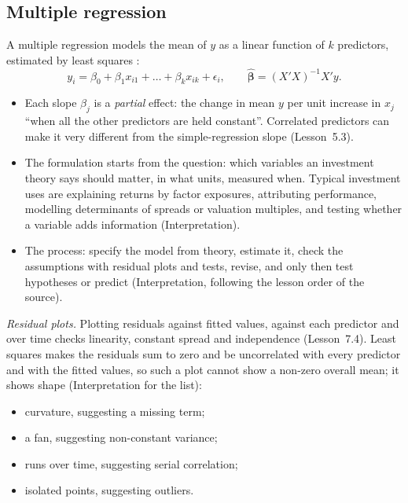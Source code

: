 \subsection{Multiple regression}

\begin{qfmethod}\label{meth:multiple-regression-formulation}
 A multiple regression models the mean of $y$ as a linear function of $k$ predictors, estimated by least squares \citep[Lessons~5.3--5.4]{regression-methods-course-notes}:
\[ y_i=\beta_0+\beta_1x_{i1}+\dots+\beta_kx_{ik}+\epsilon_i,\qquad \hat{\boldsymbol\beta}=(X'X)^{-1}X'y. \]
\begin{itemize}
\item Each slope $\beta_j$ is a \emph{partial} effect: the change in mean $y$ per unit increase in $x_j$ ``when all the other predictors are held constant''. Correlated predictors can make it very different from the simple-regression slope (Lesson~5.3).
\item The formulation starts from the question: which variables an investment theory says should matter, in what units, measured when. Typical investment uses are explaining returns by factor exposures, attributing performance, modelling determinants of spreads or valuation multiples, and testing whether a variable adds information (Interpretation).
\item The process: specify the model from theory, estimate it, check the assumptions with residual plots and tests, revise, and only then test hypotheses or predict (Interpretation, following the lesson order of the source).
\end{itemize}

\emph{Residual plots.} Plotting residuals against fitted values, against each predictor and over time checks linearity, constant spread and independence (Lesson~7.4). Least squares makes the residuals sum to zero and be uncorrelated with every predictor and with the fitted values, so such a plot cannot show a non-zero overall mean; it shows shape (Interpretation for the list):
\begin{itemize}
\item curvature, suggesting a missing term;
\item a fan, suggesting non-constant variance;
\item runs over time, suggesting serial correlation;
\item isolated points, suggesting outliers.
\end{itemize}


\end{qfmethod}
